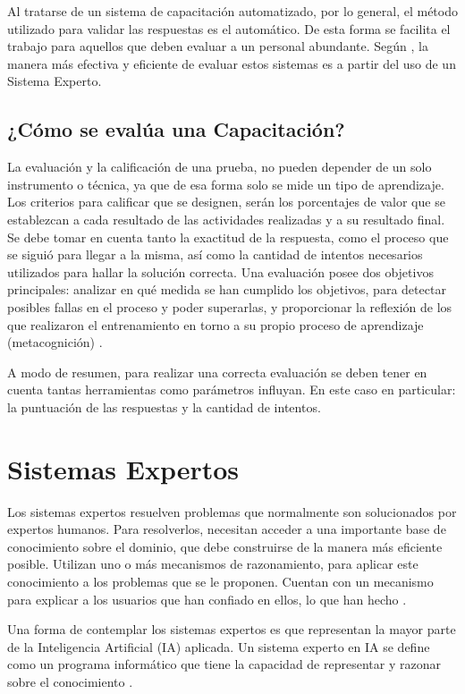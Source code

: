 Al tratarse de un sistema de capacitación automatizado, por lo general, el método utilizado para validar las respuestas es el automático. De esta forma se facilita el trabajo para aquellos que deben evaluar a un personal abundante. Según \cite{AltyJL1984}, la manera más efectiva y eficiente de evaluar estos sistemas es a partir del uso de un Sistema Experto.

\subsection{¿Cómo se evalúa una Capacitación?}
La evaluación y la calificación de una prueba, no pueden depender de un solo instrumento o técnica, ya que de esa forma solo se mide un tipo de aprendizaje. Los criterios para calificar que se designen, serán los porcentajes de valor que se establezcan a cada resultado de las actividades realizadas y a su resultado final. Se debe tomar en cuenta tanto la exactitud de la respuesta, como el proceso que se siguió para llegar a la misma, así como la cantidad de intentos necesarios utilizados para hallar la solución correcta.
Una evaluación posee dos objetivos principales: analizar en qué medida se han cumplido los objetivos, para detectar posibles fallas en el proceso y poder superarlas, y proporcionar la reflexión de los que realizaron el entrenamiento en torno a su propio proceso de aprendizaje (metacognición) \cite{RonaldL.Jacobs2012}.

A modo de resumen, para realizar una correcta evaluación se deben tener en cuenta tantas herramientas como parámetros influyan. En este caso en particular: la puntuación de las respuestas y la cantidad de intentos.


\section{Sistemas Expertos}
Los sistemas expertos resuelven problemas que normalmente son solucionados por expertos humanos. Para resolverlos, necesitan acceder a una importante base de conocimiento sobre el dominio, que debe construirse de la manera más eficiente posible.
Utilizan uno o más mecanismos de razonamiento, para aplicar este conocimiento a los problemas que se le proponen. Cuentan con un mecanismo para explicar a los usuarios que han confiado en ellos, lo que han hecho \cite{AltyJL1984}.

Una forma de contemplar los sistemas expertos es que representan la mayor parte de la Inteligencia Artificial (IA) aplicada. Un sistema experto en IA se define como un programa informático que tiene la capacidad de representar y razonar sobre el conocimiento \cite{Rasheed2021}.

